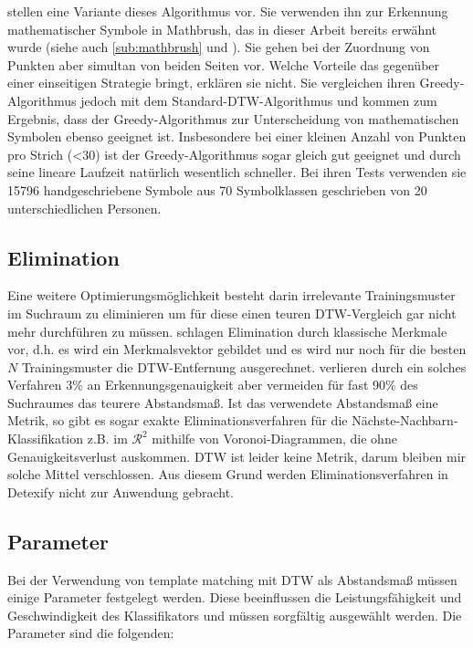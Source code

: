 \citet{MacLean:2010p9970} stellen eine Variante dieses Algorithmus vor. Sie verwenden ihn zur Erkennung mathematischer Symbole in Mathbrush, das in dieser Arbeit bereits erwähnt wurde (siehe auch \ref{sub:mathbrush} und \cite{Labahn:2008p10301}). Sie gehen bei der Zuordnung von Punkten aber simultan von beiden Seiten vor.
Welche Vorteile das gegenüber einer einseitigen Strategie bringt, erklären sie nicht. Sie vergleichen ihren Greedy-Algorithmus jedoch mit dem Standard-DTW-Algorithmus und kommen zum Ergebnis, dass der Greedy-Algorithmus zur Unterscheidung von mathematischen Symbolen ebenso geeignet ist. Insbesondere bei einer kleinen Anzahl von Punkten pro Strich (<30) ist der Greedy-Algorithmus sogar gleich gut geeignet und durch seine lineare Laufzeit natürlich wesentlich schneller. Bei ihren Tests verwenden sie 15796 handgeschriebene Symbole aus 70 Symbolklassen geschrieben von 20 unterschiedlichen Personen.

\subsection{Elimination}
\label{sec:elimnimation}

Eine weitere Optimierungsmöglichkeit besteht darin irrelevante Trainingsmuster im Suchraum zu eliminieren um für diese einen teuren DTW-Vergleich gar nicht mehr durchführen zu müssen. \citet{Watt:2005p1816} schlagen Elimination durch klassische Merkmale vor, d.h. es wird ein Merkmalsvektor gebildet und es wird nur noch für die besten $N$ Trainingsmuster die DTW-Entfernung ausgerechnet. \citet{Watt:2005p1816} verlieren durch ein solches Verfahren 3\% an Erkennungsgenauigkeit aber vermeiden für fast 90\% des Suchraumes das teurere Abstandsmaß.
Ist das verwendete Abstandsmaß eine Metrik, so gibt es sogar exakte Eliminationsverfahren für die Nächste-Nachbarn-Klassifikation z.B. im $\mathcal{R}^2$ mithilfe von Voronoi-Diagrammen, die ohne Genauigkeitsverlust auskommen. DTW ist leider keine Metrik, darum bleiben mir solche Mittel verschlossen.
Aus diesem Grund werden Eliminationsverfahren in Detexify nicht zur Anwendung gebracht.

\subsection{Parameter}
\label{sec:parameter}

Bei der Verwendung von template matching mit DTW als Abstandsmaß müssen einige Parameter festgelegt werden. Diese beeinflussen die Leistungsfähigkeit und Geschwindigkeit des Klassifikators und müssen sorgfältig ausgewählt werden. Die Parameter sind die folgenden:

